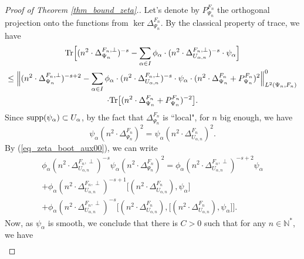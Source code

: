 \documentclass[12pt]{article}
\numberwithin{equation}{section}
\theoremstyle{theorem}
\theoremstyle{definition}
\theoremstyle{remark}
\newcommand{\nat}{\mathbb{N}}
\newcommand{\laplcomp}{\Delta}
\newcommand{\tr}[1]{{\rm{Tr}} \big[ #1 \big]}
\begin{document}
	\begin{proof}[Proof of Theorem \ref{thm_bound_zeta}.]
		Let's denote by $P_{\Psi_n}^{F_n}$ the orthogonal projection onto the functions from $\ker \laplcomp_{\Psi_n}^{F_n}$. 
		By the classical property of trace, we have
		\begin{multline}\label{eq_zeta_boot_aux_1}
			{\rm{Tr}}
			\Big[
			(n^2 \cdot\laplcomp_{\Psi_n}^{F_n, \perp})^{-s} - \sum_{\alpha \in I} \phi_{\alpha} \cdot (n^2 \cdot  \laplcomp_{U_{\alpha, n}}^{F_n, \perp})^{-s} \cdot \psi_{\alpha}			
			\Big]
			\\
			\leq
			\Big\| 
			(n^2 \cdot\laplcomp_{\Psi_n}^{F_n, \perp})^{-s+2} 
			- 
			\sum_{\alpha \in I} \phi_{\alpha} \cdot (n^2 \cdot  \laplcomp_{U_{\alpha, n}}^{F_n, \perp})^{-s} \cdot \psi_{\alpha} \cdot
			(n^2 \cdot\laplcomp_{\Psi_n}^{F_n} + P_{\Psi_n}^{F_n})^{2}
			\Big\|_{L^2(\Psi_n, F_n)}^{0}
			\\
			\cdot
			\tr{(n^2 \cdot\laplcomp_{\Psi_n}^{F_n} + P_{\Psi_n}^{F_n})^{-2}}.
		\end{multline}
		Since ${\rm{supp}}(\psi_{\alpha}) \subset U_{\alpha}$, by the fact that $\laplcomp_{\Psi_n}^{F_n}$ is “local", for $n$ big enough, we have
		\begin{equation}\label{eq_zeta_boot_aux00}
		\psi_{\alpha}
			(n^2 \cdot\laplcomp_{\Psi_n}^{F_n})^{2}
			=
		\psi_{\alpha}
			(n^2 \cdot \laplcomp_{U_{\alpha, n}}^{F_n})^{2}.
		\end{equation}
		By (\ref{eq_zeta_boot_aux00}), we can write
		\begin{multline}\label{eq_zeta_boot_aux0}
			\phi_{\alpha} (n^2 \cdot  \laplcomp_{U_{\alpha, n}}^{F_n, \perp})^{-s} \psi_{\alpha}
			(n^2 \cdot\laplcomp_{\Psi_n}^{F_n})^{2}
			=
			\phi_{\alpha} (n^2 \cdot  \laplcomp_{U_{\alpha, n}}^{F_n, \perp})^{-s + 2} \psi_{\alpha}
			\\
			+
			\phi_{\alpha} (n^2 \cdot  \laplcomp_{U_{\alpha, n}}^{F_n, \perp})^{-s + 1} 
			\big[(n^2 \cdot \laplcomp_{U_{\alpha, n}}^{F_n}), \psi_{\alpha} \big]
			\\
			+
			\phi_{\alpha} (n^2 \cdot  \laplcomp_{U_{\alpha, n}}^{F_n, \perp})^{-s} 
			\Big[(n^2 \cdot \laplcomp_{U_{\alpha, n}}^{F_n}),
			\big[(n^2 \cdot \laplcomp_{U_{\alpha, n}}^{F_n}), 
			\psi_{\alpha} \big] \Big].
		\end{multline}
		Now, as $\psi_{\alpha}$ is smooth, we conclude that there is $C > 0$ such that for any $n \in \nat^*$, we have
		\begin{equation}\label{eq_zeta_boot_aux1}
		\begin{aligned}

\end{aligned}
\end{equation}
\end{proof}
\end{document}
